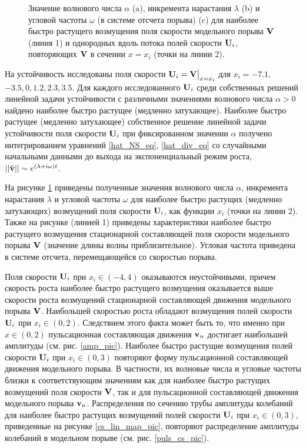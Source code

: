 \begin{figure}
\caption{Значение волнового числа $\alpha$ (a), инкремента нарастания $\lambda$ (b) и угловой частоты $\omega$ (в системе отсчета порыва) (c) для наиболее быстро растущего возмущения поля скорости модельного порыва $\mathbf{V}$ (линия 1) и однородных вдоль потока полей скорости $\mathbf{U}_i$, повторяющих $\mathbf{V}$ в сечении $x = x_i$ (точки на линии 2).}
\label{cs_lin_pic}
\end{figure}

На устойчивость исследованы поля скорости $\mathbf{U}_i = \mathbf{V}\big|_{x=x_i}$ для $x_i = -7.1,$ $-3.5, 0, 1.2, 2.3, 3.5$.  Для каждого исследованного $\mathbf{U}_i$ среди собственных решений линейной задачи устойчивости с различными значениями волнового числа $\alpha >0$ найдено наиболее быстро растущее (медленно затухающее). Наиболее быстро растущее (медленно затухающее) собственное решение линейной задачи устойчивости поля скорости $\mathbf{U}_i$ при фиксированном значении $\alpha$ получено интегрированием уравнений \eqref{hat_NS_eq}, \eqref{hat_div_eq} со случайными начальными данными до выхода на экспоненциальный режим роста, $||\hat {\mathbf{v}}|| \sim e^{(\lambda + i\omega) t}$. 

На рисунке \ref{cs_lin_pic} приведены полученные значения волнового числа $\alpha$, инкремента нарастания $\lambda$ и угловой частоты $\omega$ для наиболее быстро растущих (медленно затухающих) возмущений поля скорости $\mathbf{U}_i$, как функции $x_i$ (точки на линии 2). Также на рисунке (линией 1) приведены характеристики наиболее быстро растущего возмущения стационарной составляющей поля скорости модельного порыва $\mathbf{V}$ (значение длины волны приблизительное). Угловая частота приведена в системе отсчета, перемещающейся со скоростью порыва. 

Поля скорости $\mathbf{U}_i$ при $x_i \in (-4,4)$ оказываются неустойчивыми, причем скорость роста наиболее быстро растущего возмущения оказывается выше скорости роста возмущений стационарной составляющей движения модельного порыва $\mathbf{V}$. Наибольшей скоростью роста обладают возмущения полей скорости $\mathbf{U}_i$ при $x_i \in (0, 2)$. Следствием этого факта может быть то, что именно при $x \in (0,2)$ пульсационная составляющая движения $\mathbf{v}_n$ достигает наибольшей амплитуды (см. рис. \ref{amp_pic}). Наиболее быстро растущие  возмущения полей скорости $\mathbf{U}_i$ при $x_i \in (0,3)$ повторяют форму пульсационной составляющей движения модельного порыва. В частности, их волновые числа и угловые частоты близки к соответствующим значениям как для наиболее быстро растущих возмущений поля скорости $\mathbf{V}$, так и для пульсационной составляющей движения модельного порыва $\mathbf{v}_n$. Распределения по сечению трубы амплитуды колебаний для наиболее быстро растущих возмущений полей скорости $\mathbf{U}_i$ при $x_i \in (0,3)$, приведенные на рисунке \ref{cs_lin_map_pic}, повторяют распределение амплитуды колебаний в модельном порыве (см. рис. \ref{puls_cs_pic}).


